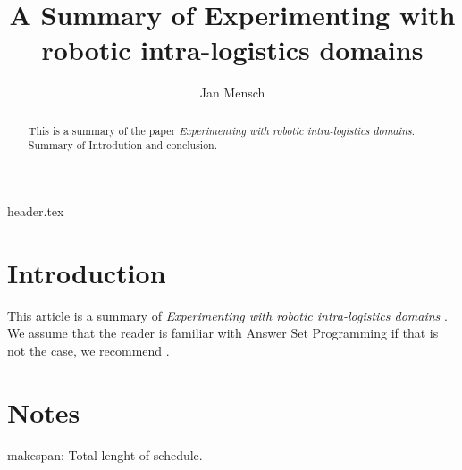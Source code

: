 \documentclass[runningheads]{llncs}
\newcommand{\papertitle}{Experimenting with robotic intra-logistics domains}
\begin{document}
\title{A Summary of \papertitle}



\author{Jan Mensch}

{header.tex}


%
\maketitle              %
%
\begin{abstract}
This is a summary of the paper \textit{\papertitle}. Summary of Introdution and conclusion.



\end{abstract}

\section{Introduction}
This article is a summary of \textit{\papertitle} \cite{janhunen2016answer}. We assume that the reader is familiar with Answer Set Programming if that is not the case, we recommend \cite{erdem2016applications}. 



\section{Notes}

makespan: Total lenght of schedule.
\end{document}
